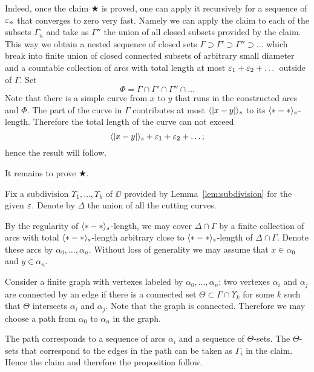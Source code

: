 Indeed, once the claim $\bigstar$ is proved, one can apply it recursively for a sequence of $\varepsilon_n$ that converges to zero very fast.
Namely we can apply the claim to each of the subsets $\Gamma_n$ and take as $\Gamma''$ the union of all closed subsets provided by the claim.
This way we obtain a nested sequence of closed sets $\Gamma\supset \Gamma'\supset\Gamma''\supset\dots$ which break into finite union 
of closed connected subsets of arbitrary small diameter
and a countable collection of arcs with total length at most $\varepsilon_1+\varepsilon_2+\dots$ 
outside of $\Gamma$.
Set 
\[\Phi=\Gamma\cap \Gamma'\cap\Gamma''\cap\dots\]
Note that there is a simple curve from $x$ to $y$ that runs in the constructed arcs and $\Phi$.
The part of the curve in $\Gamma$ contributes at most $\langle|x-y|\rangle_s$ to its $\langle{*}-{*}\rangle_s$-length.
Therefore the total length of the curve can not exceed 
\[\langle|x-y|\rangle_s+\varepsilon_1+\varepsilon_2+\dots;\]
hence the result will follow.

It remains to prove $\bigstar$.

Fix a subdivision $\Upsilon_1,\dots,\Upsilon_k$ of $\DD$ provided by Lemma~\ref{lem:subdivision} for the given $\varepsilon$.
Denote by $\Delta$ the union of all the cutting curves.

By the regularity of $\langle{*}-{*}\rangle_s$-length, we may cover $\Delta\cap\Gamma$ by a finite collection of arcs with total  $\langle{*}-{*}\rangle_s$-length arbitrary close to $\langle{*}-{*}\rangle_s$-length of $\Delta\cap\Gamma$.
Denote these arcs by $\alpha_0,\dots,\alpha_n$.
Without loss of generality we may assume that $x\in\alpha_0$ and $y\in\alpha_n$.

Consider a finite graph with vertexes labeled by $\alpha_0,\dots,\alpha_n$;
two vertexes $\alpha_i$ and $\alpha_j$ are connected by an edge if there is a connected set $\Theta\subset \Gamma\cap\Upsilon_k$ 
for some $k$ such that $\Theta$ intersects $\alpha_i$ and $\alpha_j$.
Note that the graph is connected. Therefore we may choose a path from $\alpha_0$ to $\alpha_n$ in the graph.

The path corresponds to a sequence of arcs $\alpha_i$ and a sequence of $\Theta$-sets.
The $\Theta$-sets that correspond to the edges in the path can be taken as $\Gamma_i$ in the claim.
Hence the claim and therefore the proposition follow. 
\qeds



